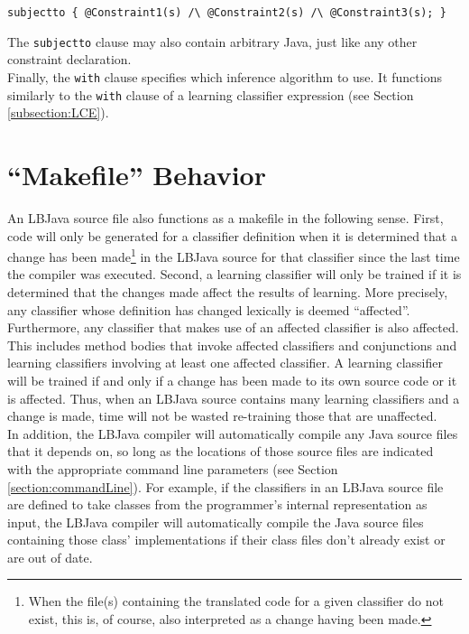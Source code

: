 \vspace{-.25cm}
{\tt subjectto
     \{ \verb|@Constraint1(s) /\ @Constraint2(s) /\ @Constraint3(s);| \}} \\
\vspace{-.25cm}

\noindent
The {\tt subjectto} clause may also contain arbitrary Java, just like any
other constraint declaration. \\

Finally, the {\tt with} clause specifies which inference algorithm to use.  It
functions similarly to the {\tt with} clause of a learning classifier
expression (see Section \ref{subsection:LCE}).

\section{``Makefile'' Behavior}

An LBJava source file also functions as a makefile in the following sense.
First, code will only be generated for a classifier definition when it is
determined that a change has been made\footnote{When the file(s) containing
the translated code for a given classifier do not exist, this is, of course,
also interpreted as a change having been made.} in the LBJava source for that
classifier since the last time the compiler was executed.  Second, a learning
classifier will only be trained if it is determined that the changes made
affect the results of learning.  More precisely, any classifier whose
definition has changed lexically is deemed ``affected''.  Furthermore, any
classifier that makes use of an affected classifier is also affected.  This
includes method bodies that invoke affected classifiers and conjunctions and
learning classifiers involving at least one affected classifier.  A learning
classifier will be trained if and only if a change has been made to its own
source code or it is affected.  Thus, when an LBJava source contains many
learning classifiers and a change is made, time will not be wasted re-training
those that are unaffected. \\

In addition, the LBJava compiler will automatically compile any Java source files
that it depends on, so long as the locations of those source files are
indicated with the appropriate command line parameters (see Section
\ref{section:commandLine}).  For example, if the classifiers in an LBJava source
file are defined to take classes from the programmer's internal representation
as input, the LBJava compiler will automatically compile the Java source files
containing those class' implementations if their class files don't already
exist or are out of date.

